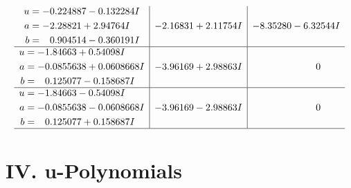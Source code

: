 \documentclass[1p]{elsarticle_modified}
\theoremstyle{definition}
\begin{document}
$$\begin{array}{c|c|c}
\begin{aligned}
u &= -0.224887 - 0.132284 I \\
a &= -2.28821 + 2.94764 I \\
b &= \phantom{-}0.904514 - 0.360191 I\end{aligned}
 & -2.16831 + 2.11754 I & -8.35280 - 6.32544 I \\ \hline\begin{aligned}
u &= -1.84663 + 0.54098 I \\
a &= -0.0855638 + 0.0608668 I \\
b &= \phantom{-}0.125077 - 0.158687 I\end{aligned}
 & -3.96169 + 2.98863 I & \phantom{-0.000000 } 0 \\ \hline\begin{aligned}
u &= -1.84663 - 0.54098 I \\
a &= -0.0855638 - 0.0608668 I \\
b &= \phantom{-}0.125077 + 0.158687 I\end{aligned}
 & -3.96169 - 2.98863 I & \phantom{-0.000000 } 0\\
 \hline 
 \end{array}$$\newpage
\newpage\renewcommand{\arraystretch}{1}
\centering \section*{ IV. u-Polynomials}
\end{document}
